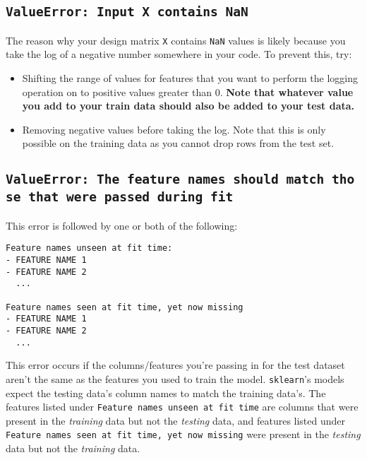 \documentclass[
  letterpaper,
  DIV=11,
  numbers=noendperiod]{scrreprt}
\providecommand{\tightlist}{%
  \setlength{\itemsep}{0pt}\setlength{\parskip}{0pt}}\usepackage{longtable,booktabs,array}
\begin{document}
\subsection{\texorpdfstring{\texttt{ValueError:\ Input\ X\ contains\ NaN}}{ValueError: Input X contains NaN}}\label{valueerror-input-x-contains-nan}

The reason why your design matrix \texttt{X} contains \texttt{NaN}
values is likely because you take the log of a negative number somewhere
in your code. To prevent this, try:

\begin{itemize}
\tightlist
\item
  Shifting the range of values for features that you want to perform the
  logging operation on to positive values greater than 0. \textbf{Note
  that whatever value you add to your train data should also be added to
  your test data.}
\item
  Removing negative values before taking the log. Note that this is only
  possible on the training data as you cannot drop rows from the test
  set.
\end{itemize}

\subsection{\texorpdfstring{\texttt{ValueError:\ The\ feature\ names\ should\ match\ those\ that\ were\ passed\ during\ fit}}{ValueError: The feature names should match those that were passed during fit}}\label{valueerror-the-feature-names-should-match-those-that-were-passed-during-fit}

This error is followed by one or both of the following:

\begin{verbatim}
Feature names unseen at fit time: 
- FEATURE NAME 1
- FEATURE NAME 2
  ...

Feature names seen at fit time, yet now missing
- FEATURE NAME 1
- FEATURE NAME 2
  ...
\end{verbatim}

This error occurs if the columns/features you're passing in for the test
dataset aren't the same as the features you used to train the model.
\texttt{sklearn}'s models expect the testing data's column names to
match the training data's. The features listed under
\texttt{Feature\ names\ unseen\ at\ fit\ time} are columns that were
present in the \emph{training} data but not the \emph{testing} data, and
features listed under
\texttt{Feature\ names\ seen\ at\ fit\ time,\ yet\ now\ missing} were
present in the \emph{testing} data but not the \emph{training} data.
\end{document}
